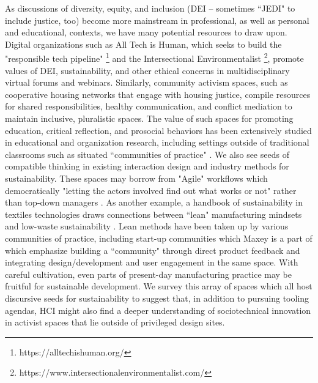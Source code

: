 As discussions of diversity, equity, and inclusion (DEI -- sometimes ``JEDI" to include justice, too) become more mainstream in professional, as well as personal and educational, contexts, we have many potential resources to draw upon. Digital organizations such as All Tech is Human, which seeks to build the "responsible tech pipeline" \footnote{https://alltechishuman.org/} and the Intersectional Environmentalist \footnote{https://www.intersectionalenvironmentalist.com/}, promote values of DEI, sustainability, and other ethical concerns in multidisciplinary virtual forums and webinars. Similarly, community activism spaces, such as cooperative housing networks that engage with housing justice, compile resources for shared responsibilities, healthy communication, and conflict mediation \cite{nahc_national_nodate, aorta_aorta_2021} to maintain inclusive, pluralistic spaces.
The value of such spaces for promoting education, critical reflection, and prosocial behaviors has been extensively studied in educational and organization research, including settings outside of traditional classrooms such as situated ``communities of practice" \cite{wenger_communities_1999}.
We also see seeds of compatible thinking in existing interaction design and industry methods for sustainability. These spaces may borrow from "Agile" workflows which democratically "letting the actors involved find out what works or not" rather than top-down managers \cite{rolland_scaling_2016}. As another example, a handbook of sustainability in textiles technologies draws connections between ``lean" manufacturing mindsets and low-waste sustainability \cite{muthu_textiles_2017}. Lean methods have been taken up by various communities of practice, including start-up communities which Maxey is a part of \cite{ries_lean_2011} which emphasize building a ``community" through direct product feedback and integrating design/development and user engagement in the same space. With careful cultivation, even parts of present-day manufacturing practice may be fruitful for sustainable development. We survey this array of spaces which all host discursive seeds for sustainability to suggest that, in addition to pursuing tooling agendas, HCI might also find a deeper understanding of sociotechnical innovation in activist spaces that lie outside of privileged design sites.



